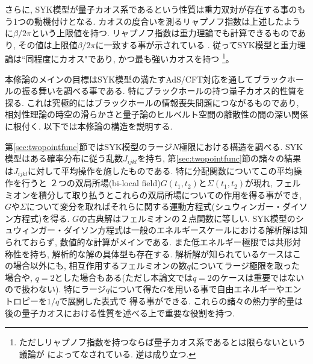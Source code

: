 さらに, SYK模型が量子カオス系であるという性質は重力双対が存在する事のもう1つの動機付けとなる.
カオスの度合いを測るリャプノフ指数は上述したように$\beta / 2\pi$という上限値を持つ.
リャプノフ指数は重力理論でも計算できるものであり, その値は上限値$\beta / 2\pi$に一致する事が示されている
\cite{shenker}.
従ってSYK模型と重力理論は``同程度にカオス"であり, かつ最も強いカオスを持つ
\footnote{ただしリャプノフ指数を持つならば量子カオス系であるとは限らないという議論が\cite{eiki}
によってなされている. 逆は成り立つ.}。


本修論のメインの目標はSYK模型の満たすAdS/CFT対応を通してブラックホールの振る舞いを調べる事である. 
特にブラックホールの持つ量子カオス的性質を探る. 
これは究極的にはブラックホールの情報喪失問題につながるものであり, 
相対性理論の時空の滑らかさと量子論のヒルベルト空間の離散性の間の深い関係に根付く\cite{stanford_chaos}. 
以下では本修論の構造を説明する. 

第\ref{sec:twopointfunc}節ではSYK模型のラージ$N$極限における構造を調べる. 
SYK模型はある確率分布に従う乱数$J_{ijkl}$を持ち, 
第\ref{sec:twopointfunc}節の諸々の結果は$J_{ijkl}$に対して平均操作を施したものである. 
特に分配関数についてこの平均操作を行うと
２つの双局所場(bi-local field)$G(t_1, t_2)$と$\Sigma(t_1, t_2)$が現れ, 
フェルミオンを積分して取り払うとこれらの双局所場についての作用を得る事ができ, 
$G$や$\Sigma$について変分を取ればそれらに関する運動方程式(シュウィンガー・ダイソン方程式)を得る. 
$G$の古典解はフェルミオンの２点関数に等しい. 
SYK模型のシュウィンガー・ダイソン方程式は一般のエネルギースケールにおける解析解は知られておらず, 
数値的な計算がメインである. 
また低エネルギー極限では共形対称性を持ち, 解析的な解の具体型も存在する. 
解析解が知られているケースはこの場合以外にも, 
相互作用するフェルミオンの数$q$についてラージ極限を取った場合や, 
$q=2$とした場合もある(ただし本論文では$q=2$のケースは重要ではないので扱わない). 
特にラージ$q$について得た$G$を用いる事で自由エネルギーやエントロピーを$1/q$で展開した表式で
得る事ができる. 
これらの諸々の熱力学的量は後の量子カオスにおける性質を述べる上で重要な役割を持つ. 

